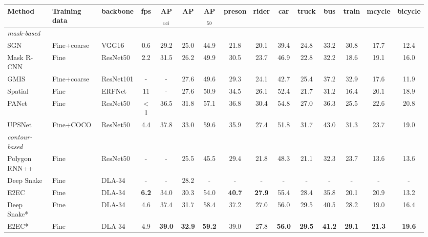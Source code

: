 \documentclass[10pt,twocolumn,letterpaper]{article}
\begin{document}
\begin{table*}[t]
\begin{minipage}[c]{0.75\linewidth}
\centering
  \setlength{\tabcolsep}{0.35mm}
  \begin{footnotesize}
  \begin{tabular}{l|l|l|cc c c c c c c c c c c}
    Method & Training data & backbone & fps & AP$_{val}$ & AP & AP$_{50}$ & preson & rider & car & truck & bus & train & mcycle & bicycle\\
    \hline
    \emph{mask-based} &&&&&&&&&&&&&&\\
    SGN \cite{sgn} & Fine+coarse & VGG16 & 0.6 & 29.2 & 25.0 & 44.9 & 21.8 & 20.1 & 39.4 & 24.8 & 33.2 & 30.8 & 17.7 & 12.4 \\
    Mask R-CNN \cite{maskrcnn} & Fine & ResNet50 & 2.2 & 31.5 & 26.2 & 49.9 & 30.5 & 23.7 & 46.9 & 22.8 & 32.2 & 18.6 & 19.1& 16.0 \\
    GMIS \cite{gmis} & Fine+coarse & ResNet101 & - & - & 27.6 & 49.6 & 29.3 & 24.1 & 42.7 & 25.4 & 37.2 & 32.9 & 17.6 & 11.9 \\
    Spatial \cite{spatial} & Fine & ERFNet & 11 & - & 27.6 & 50.9 & 34.5 & 26.1 & 52.4 & 21.7	 & 31.2 & 16.4 & 20.1 & 18.9 \\
    PANet \cite{panet} & Fine & ResNet50 & $<$1 & 36.5 & 31.8 & 57.1 & 36.8 & 30.4 & 54.8 & 27.0 & 36.3 & 25.5 & 22.6 & 20.8 \\
    UPSNet \cite{upsnet} & Fine+COCO& ResNet50 & 4.4 & 37.8 & 33.0 & 59.6 & 35.9 & 27.4 & 51.8 & 31.7 & 43.0 & 31.3 & 23.7 & 19.0 \\
    \hline
    \emph{contour-based} &&&&&&&&&&&&&&\\
    Polygon RNN++ \cite{polygonrnn} & Fine & ResNet50 & - & - & 25.5 & 45.5 & 29.4 & 21.8 & 48.3 & 21.1 & 32.3 & 23.7 & 13.6 & 13.6 \\
    Deep Snake \cite{deepsnake} & Fine & DLA-34 & - & -& 28.2 & - & - & - & - & - & - & - & - & - \\
    E2EC & Fine & DLA-34 & \textbf{6.2} & 34.0 & 30.3 & 54.0 & \textbf{40.7} & \textbf{27.9} & 55.4 & 28.4 & 35.8 & 20.1 & 20.9 & 13.2 \\
    Deep Snake* \cite{deepsnake} & Fine & DLA-34 & 4.6 & 37.4 & 31.7 & 58.4 & 37.2 & 27.0 & 56.0 & 29.5 & 40.5 & 28.2 & 19.0 & 16.4 \\
    E2EC* & Fine & DLA-34 & 4.9 & \textbf{39.0} & \textbf{32.9} & \textbf{59.2} & 39.0 & 27.8 & \textbf{56.0} & \textbf{29.5} & \textbf{41.2} & \textbf{29.1} & \textbf{21.3} & \textbf{19.6} \\

\end{tabular}
\end{footnotesize}
\end{minipage}
\end{table*}
\end{document}
